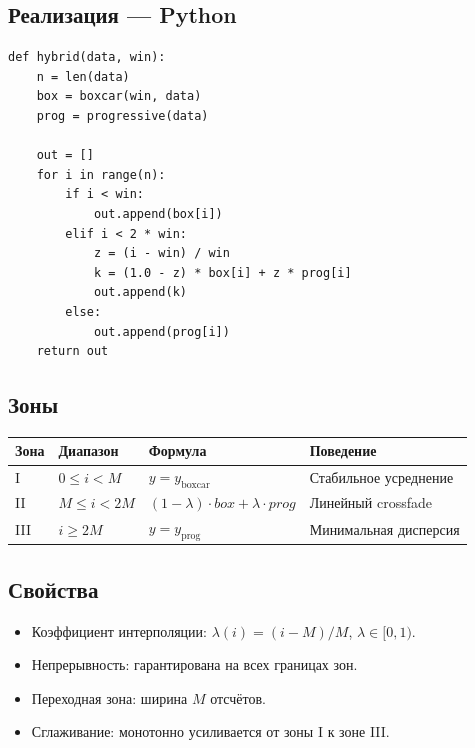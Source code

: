 \documentclass[12pt,a4paper]{article}
\begin{document}
\subsection{Реализация --- Python}

\begin{lstlisting}
def hybrid(data, win):
    n = len(data)
    box = boxcar(win, data)
    prog = progressive(data)

    out = []
    for i in range(n):
        if i < win:
            out.append(box[i])
        elif i < 2 * win:
            z = (i - win) / win
            k = (1.0 - z) * box[i] + z * prog[i]
            out.append(k)
        else:
            out.append(prog[i])
    return out
\end{lstlisting}

\subsection{Зоны}

\begin{center}
\begin{tabular}{|l|l|l|l|}
\hline
\textbf{Зона} & \textbf{Диапазон} & \textbf{Формула} & \textbf{Поведение} \\
\hline
I   & $0 \leq i < M$     & $y = y_{\text{boxcar}}$   & Стабильное усреднение \\
II  & $M \leq i < 2M$    & $(1{-}\lambda) \cdot box + \lambda \cdot prog$ & Линейный crossfade \\
III & $i \geq 2M$        & $y = y_{\text{prog}}$      & Минимальная дисперсия \\
\hline
\end{tabular}
\end{center}

\subsection{Свойства}

\begin{itemize}
  \item Коэффициент интерполяции: $\lambda(i) = (i - M) / M$, $\lambda \in [0, 1)$.
  \item Непрерывность: гарантирована на всех границах зон.
  \item Переходная зона: ширина $M$ отсчётов.
  \item Сглаживание: монотонно усиливается от зоны I к зоне III.
\end{itemize}
\end{document}
